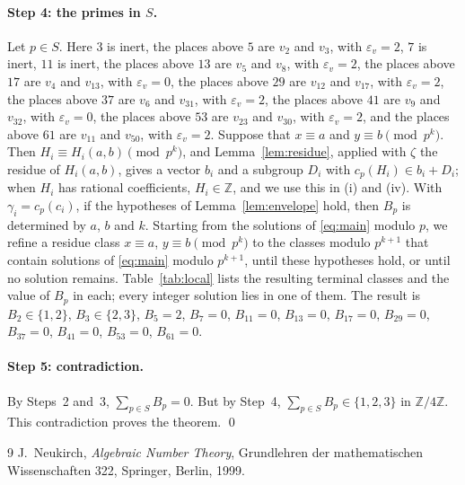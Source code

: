 \documentclass[11pt]{article}
\newcommand{\Z}{\mathbb{Z}}
\begin{document}
\paragraph{Step 4: the primes in $S$.} Let $p\in S$. Here $3$ is inert, the places above $5$ are $v_{2}$ and $v_{3}$, with $\varepsilon_v=2$, $7$ is inert, $11$ is inert, the places above $13$ are $v_{5}$ and $v_{8}$, with $\varepsilon_v=2$, the places above $17$ are $v_{4}$ and $v_{13}$, with $\varepsilon_v=0$, the places above $29$ are $v_{12}$ and $v_{17}$, with $\varepsilon_v=2$, the places above $37$ are $v_{6}$ and $v_{31}$, with $\varepsilon_v=2$, the places above $41$ are $v_{9}$ and $v_{32}$, with $\varepsilon_v=0$, the places above $53$ are $v_{23}$ and $v_{30}$, with $\varepsilon_v=2$, and the places above $61$ are $v_{11}$ and $v_{50}$, with $\varepsilon_v=2$. Suppose that $x\equiv a$ and $y\equiv b\pmod{p^k}$. Then $H_i\equiv H_i(a,b)\pmod{p^k}$, and Lemma~\ref{lem:residue}, applied with $\zeta$ the residue of $H_i(a,b)$, gives a vector $b_i$ and a subgroup $D_i$ with $c_p(H_i)\in b_i+D_i$; when $H_i$ has rational coefficients, $H_i\in\Z$, and we use this in (i) and (iv). With $\gamma_i=c_p(c_i)$, if the hypotheses of Lemma~\ref{lem:envelope} hold, then $B_p$ is determined by $a$, $b$ and $k$. Starting from the solutions of \eqref{eq:main} modulo $p$, we refine a residue class $x\equiv a$, $y\equiv b\pmod{p^k}$ to the classes modulo $p^{k+1}$ that contain solutions of \eqref{eq:main} modulo $p^{k+1}$, until these hypotheses hold, or until no solution remains. Table~\ref{tab:local} lists the resulting terminal classes and the value of $B_p$ in each; every integer solution lies in one of them. The result is $B_{2}\in\{1,2\}$, $B_{3}\in\{2,3\}$, $B_{5}=2$, $B_{7}=0$, $B_{11}=0$, $B_{13}=0$, $B_{17}=0$, $B_{29}=0$, $B_{37}=0$, $B_{41}=0$, $B_{53}=0$, $B_{61}=0$.

\paragraph{Step 5: contradiction.} By Steps~2 and~3, $\sum_{p\in S}B_p=0$. But by Step~4, $\sum_{p\in S}B_p\in\{1,2,3\}$ in $\Z/4\Z$. This contradiction proves the theorem.
\qed


\begin{thebibliography}{9}
 J.~Neukirch, \emph{Algebraic Number Theory}, Grundlehren der mathematischen Wissenschaften 322, Springer, Berlin, 1999.
\end{thebibliography}
\end{document}
